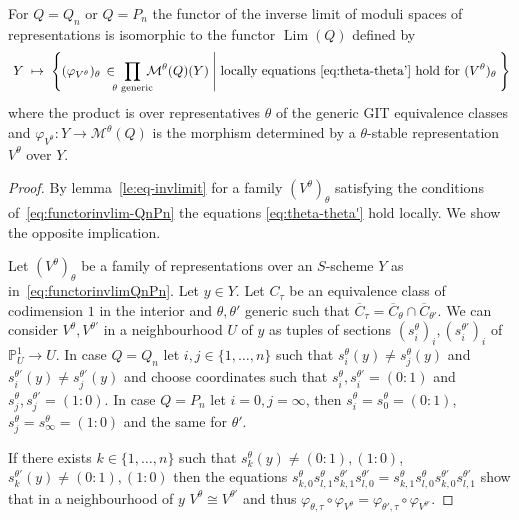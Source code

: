\documentclass[ALCO,ThmDefs,Unicode,epreuves]{cedram}
\def\phi{\varphi}
\def\P{\mathds P}
\DeclareMathOperator{\Lim}{Lim}
\begin{document}
\begin{prop}\label{prop:functorinvlimQnPn}
For $Q=Q_n$ or $Q=P_n$ the functor of the inverse limit of moduli spaces
of representations is isomorphic to the functor $\Lim(Q)$ defined by
\begin{equation}\label{eq:functorinvlimQnPn}
\;Y\;\mapsto\;
\Bigg\{
(\phi_{V^\theta})_\theta\,\in\!\!\!\prod_{\text{$\theta$ generic}}\!\!\!\!
\mathcal M^\theta(Q)(Y)
\;\Bigg|\;
\text{locally equations~\eqref{eq:theta-theta'} hold for $(V^\theta)_\theta$}\:
\Bigg\}
\end{equation}
where the product is over representatives $\theta$ of the generic GIT equivalence classes
and $\phi_{V^\theta}\colon Y\to\mathcal M^\theta(Q)$ is the morphism determined by a
$\theta$-stable representation $V^\theta$ over $Y$.
\end{prop}
\begin{proof}
By lemma~\ref{le:eq-invlimit} for a family $(V^\theta)_\theta$ 
satisfying the conditions of~\eqref{eq:functorinvlim-QnPn} the equations 
\eqref{eq:theta-theta'} hold locally. We show the opposite implication.

Let $(V^\theta)_\theta$ be a family of representations over an $S$-scheme $Y$
as in~\eqref{eq:functorinvlimQnPn}. Let $y\in Y$. 
Let $C_\tau$ be an equivalence class of codimension $1$ in the interior 
and $\theta,\theta'$ generic such that
$\overline{C}_\tau=\overline{C}_\theta\cap\overline{C}_{\theta'}$.
We can consider $V^\theta,V^{\theta'}$ in a neighbourhood $U$ of $y$ as tuples of 
sections $(s^\theta_i)_i,(s^{\theta'}_i)_i$ of $\P^1_U\to U$.
In case $Q=Q_n$ let $i,j\in\{1,\ldots,n\}$ such that $s^\theta_i(y)\neq s^\theta_j(y)$ 
and $s^{\theta'}_i(y)\neq s^{\theta'}_j(y)$ and choose coordinates such that 
$s^\theta_i,s^{\theta'}_i=(0:1)$ and $s^\theta_j,s^{\theta'}_j=(1:0)$. 
In case $Q=P_n$ let $i=0,j=\infty$, then $s^\theta_i=s^\theta_0=(0:1)$, %
$s^\theta_j=s^\theta_\infty=(1:0)$ and the same for $\theta'$.

If there exists $k\in\{1,\ldots,n\}$ such that $s^\theta_k(y)\neq(0:1),(1:0)$,
$s^{\theta'}_k(y)\neq(0:1),(1:0)$ then the equations 
$s^\theta_{k,0}s^\theta_{l,1}s^{\theta'}_{k,1}s^{\theta'}_{l,0}
=s^\theta_{k,1}s^\theta_{l,0}s^{\theta'}_{k,0}s^{\theta'}_{l,1}$
show that in a neighbourhood of $y$ $V^\theta\cong V^{\theta'}$ and thus
$\phi_{\theta,\tau}\circ\phi_{V^\theta}=\phi_{\theta',\tau}\circ\phi_{V^{\theta'}}$.


\end{proof}
\end{document}

